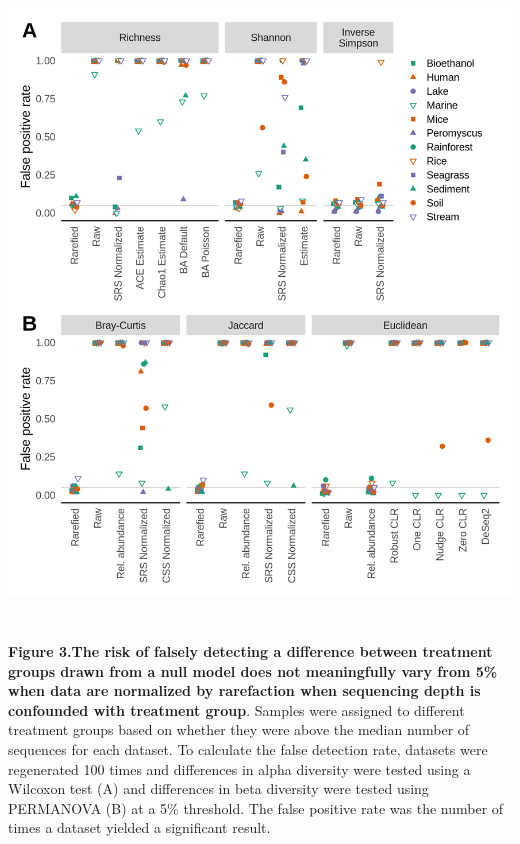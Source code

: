 \documentclass[
]{article}
\begin{document}
\newpage

\includegraphics[height=17cm]{figure_3.png}

\textbf{Figure 3.The risk of falsely detecting a difference between
treatment groups drawn from a null model does not meaningfully vary from
5\% when data are normalized by rarefaction when sequencing depth is
confounded with treatment group}. Samples were assigned to different
treatment groups based on whether they were above the median number of
sequences for each dataset. To calculate the false detection rate,
datasets were regenerated 100 times and differences in alpha diversity
were tested using a Wilcoxon test (A) and differences in beta diversity
were tested using PERMANOVA (B) at a 5\% threshold. The false positive
rate was the number of times a dataset yielded a significant result.

\newpage
\end{document}
